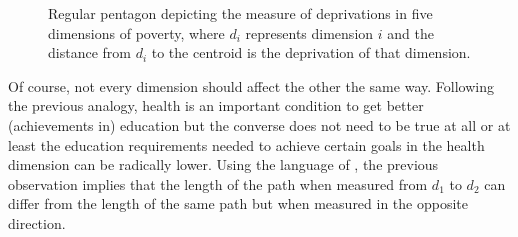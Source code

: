 \documentclass[english, a4paper,12pt]{article}
\begin{document}
	\begin{figure}
		\centering
		\caption{Regular pentagon depicting the measure of deprivations in five dimensions of poverty, where $d_{i}$ represents dimension $i$ and the distance from $d_{i}$ to the centroid is the deprivation of that dimension.}
		 \quad
		
		\label{fig:roads}
	\end{figure}

Of course, not every dimension should affect the other the same way. Following the previous analogy, health is an important condition to get better (achievements in) education but the converse does not need to be true at all or at least the education requirements needed to achieve certain goals in the health dimension can be radically lower. Using the language of , the previous observation implies that the length of the path when measured from $d_{1}$ to $d_{2}$ can differ from the length of the same path but when measured in the opposite direction. 

\end{document}
